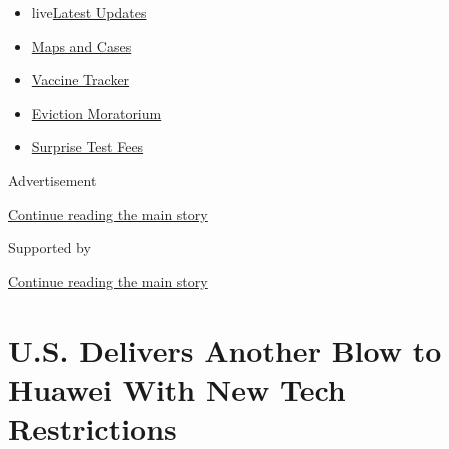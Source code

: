 \begin{itemize}
\tightlist
\item
  live\href{https://www.nytimes3xbfgragh.onion/2020/09/09/world/covid-19-coronavirus.html?name=styln-coronavirus-markets\&region=TOP_BANNER\&block=storyline_menu_recirc\&action=click\&pgtype=Article\&impression_id=b7c5ae11-f2cb-11ea-b558-854c80501eb6\&variant=undefined}{Latest
  Updates}
\item
  \href{https://www.nytimes3xbfgragh.onion/interactive/2020/us/coronavirus-us-cases.html?name=styln-coronavirus-markets\&region=TOP_BANNER\&block=storyline_menu_recirc\&action=click\&pgtype=Article\&impression_id=b7c5ae12-f2cb-11ea-b558-854c80501eb6\&variant=undefined}{Maps
  and Cases}
\item
  \href{https://www.nytimes3xbfgragh.onion/interactive/2020/science/coronavirus-vaccine-tracker.html?name=styln-coronavirus-markets\&region=TOP_BANNER\&block=storyline_menu_recirc\&action=click\&pgtype=Article\&impression_id=b7c5ae13-f2cb-11ea-b558-854c80501eb6\&variant=undefined}{Vaccine
  Tracker}
\item
  \href{https://www.nytimes3xbfgragh.onion/2020/09/02/your-money/eviction-moratorium-covid.html?name=styln-coronavirus-markets\&region=TOP_BANNER\&block=storyline_menu_recirc\&action=click\&pgtype=Article\&impression_id=b7c5ae14-f2cb-11ea-b558-854c80501eb6\&variant=undefined}{Eviction
  Moratorium}
\item
  \href{https://www.nytimes3xbfgragh.onion/2020/09/09/upshot/coronavirus-surprise-test-fees.html?name=styln-coronavirus-markets\&region=TOP_BANNER\&block=storyline_menu_recirc\&action=click\&pgtype=Article\&impression_id=b7c5d520-f2cb-11ea-b558-854c80501eb6\&variant=undefined}{Surprise
  Test Fees}
\end{itemize}

Advertisement

\protect\hyperlink{after-top}{Continue reading the main story}

Supported by

\protect\hyperlink{after-sponsor}{Continue reading the main story}

\hypertarget{us-delivers-another-blow-to-huawei-with-new-tech-restrictions}{%
\section{U.S. Delivers Another Blow to Huawei With New Tech
Restrictions}\label{us-delivers-another-blow-to-huawei-with-new-tech-restrictions}}

